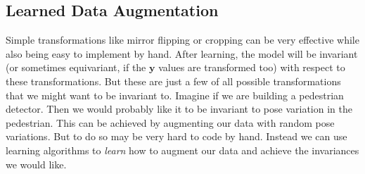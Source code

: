 \subsection{Learned Data Augmentation}
Simple transformations like mirror flipping or cropping can be very effective while also being easy to implement by hand. After learning, the model will be invariant (or sometimes equivariant, if the $\mathbf{y}$ values are transformed too) with respect to these transformations. But these are just a few of all possible transformations that we might want to be invariant to. Imagine if we are building a pedestrian detector. Then we would probably like it to be invariant to pose variation in the pedestrian. This can be achieved by augmenting our data with random pose variations. But to do so may be very hard to code by hand. Instead we can use learning algorithms to \textit{learn} how to augment our data and achieve the invariances we would like.


